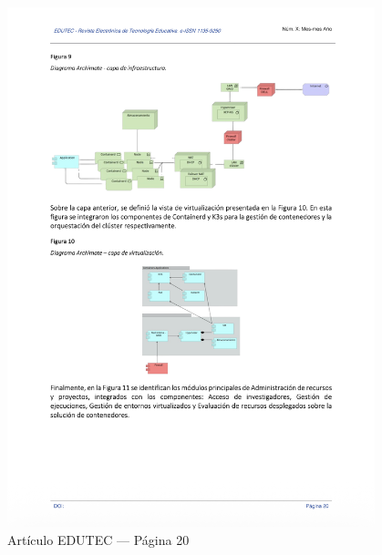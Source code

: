 \begin{figure}[H]
    \centering
    \begin{tcolorbox}[
        colback=white,
        colframe=gray!50,
        boxrule=1pt,
        arc=2pt,
        boxsep=5pt,
        left=3pt,
        right=3pt,
        top=3pt,
        bottom=3pt,
        drop shadow
    ]
        \includegraphics[width=0.95\textwidth,keepaspectratio]{apendices/EDUTEC/20.png}
    \end{tcolorbox}
    \caption{Artículo EDUTEC --- Página 20}\label{fig:edutec-pagina-20}
\end{figure}
\FloatBarrier

